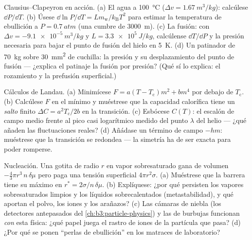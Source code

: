 \begin{exercise}[$\star\star$]\label{exo:b3:phase-transitions:7}
Clausius--Clapeyron en acción. (a) El agua a \qty{100}{\celsius}
($\Delta v = \qty{1.67}{m^3/kg}$): calcúlese $\dd P/\dd T$. (b)
Úsese $\dd\ln P/\dd T = Lm_{\text{w}}/k_{\text{B}}T^2$ para estimar
la temperatura de ebullición a $P = \qty{0.7}{atm}$ (una cumbre de
\qty{3000}{m}). (c) La fusión: con $\Delta v = \qty{-9.1e-5}{m^3/kg}$ y
$L = \qty{3.3e5}{J/kg}$, calcúlense $\dd T/\dd P$ y la presión
necesaria para bajar el punto de fusión del hielo en \qty{5}{K}. (d) Un
patinador de \qty{70}{kg} sobre \qty{30}{mm^2} de cuchilla: la presión y
su desplazamiento del punto de fusión --- ¿explica el patinaje la fusión
por presión? (Qué sí lo explica: el rozamiento y la prefusión superficial.)
\end{exercise}

\begin{exercise}[$\star\star$]\label{exo:b3:phase-transitions:8}
Cálculos de Landau. (a) Minimícese $F = a(T - T_{\text{c}})m^2 +
bm^4$ por debajo de $T_{\text{c}}$. (b) Calcúlese $F$ en el mínimo y
muéstrese que la capacidad calorífica tiene un \emph{salto} finito $\Delta C =
a^2T_{\text{c}}/2b$ en la transición. (c) Esbócese $C(T)$: el
escalón de campo medio frente al pico casi logarítmico medido del
punto $\lambda$ del helio --- ¿qué añaden las fluctuaciones reales? (d)
Añádase un término de campo $-hm$: muéstrese que la transición se redondea ---
la simetría ha de ser exacta para poder romperse.
\end{exercise}

\begin{exercise}[$\star\star$]\label{exo:b3:phase-transitions:9}
Nucleación. Una gotita de radio $r$ en vapor sobresaturado
gana  de volumen $-\tfrac43\pi r^3\,n\,\delta\mu$ pero paga
una tensión superficial $4\pi r^2\sigma$. (a) Muéstrese que la barrera tiene su máximo en
$r^* = 2\sigma/n\,\delta\mu$. (b) Explíquese: ¿por qué persisten los
vapores sobresaturados limpios y los líquidos sobrecalentados
(metastabilidad), y qué aportan el polvo, los iones y los arañazos?
(c) Las cámaras de niebla (los detectores antepasados del
\cref{ch:b3:particle-physics}) y las de burbujas funcionan \emph{con} esta
física: ¿qué papel juega el rastro de iones de la partícula que pasa? (d) ¿Por qué
se ponen ``perlas de ebullición'' en los matraces de laboratorio?
\end{exercise}

